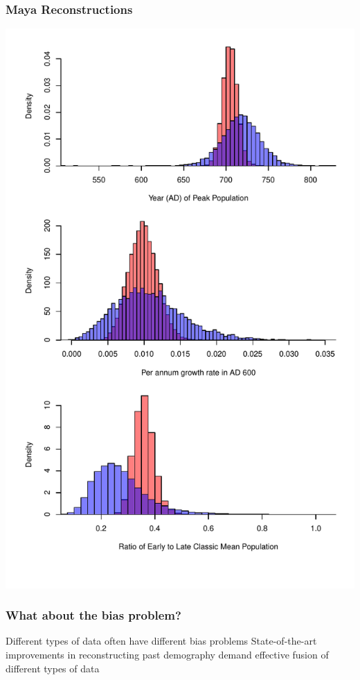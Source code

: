 \documentclass{beamer}
\begin{document}
\begin{frame}[t]
  \frametitle{Maya Reconstructions}
    \includegraphics[height=.85\textheight]{Fig5_maya_histograms.pdf}
\end{frame}

\begin{frame}[t]
  \frametitle{What about the bias problem?}
  Different types of data often have different bias problems
  \bigskip
  State-of-the-art improvements in reconstructing past demography demand effective fusion of different types of data
\end{frame}
\end{document}
